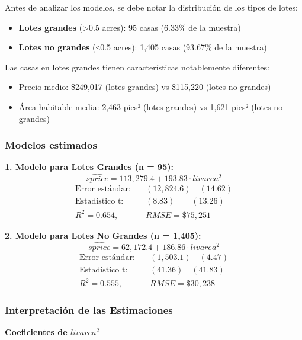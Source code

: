 \documentclass[12pt]{article}
\begin{document}
Antes de analizar los modelos, se debe notar la distribución de los tipos de lotes:
\begin{itemize}
    \item \textbf{Lotes grandes} (>0.5 acres): 95 casas (6.33\% de la muestra)
    \item \textbf{Lotes no grandes} (≤0.5 acres): 1,405 casas (93.67\% de la muestra)
\end{itemize}

Las casas en lotes grandes tienen características notablemente diferentes:
\begin{itemize}
    \item Precio medio: \$249,017 (lotes grandes) vs \$115,220 (lotes no grandes)
    \item Área habitable media: 2,463 pies² (lotes grandes) vs 1,621 pies² (lotes no grandes)
\end{itemize}

\subsubsection*{Modelos estimados}

\textbf{1. Modelo para Lotes Grandes (n = 95):}
\[
\widehat{sprice} = 113,279.4 + 193.83 \cdot livarea^2
\]
\begin{align}
\text{Error estándar:} \quad & (12,824.6) \quad (14.62) \\
\text{Estadístico t:} \quad & (8.83) \quad\quad (13.26) \\
R^2 = 0.654, \quad & RMSE = \$75,251
\end{align}

\textbf{2. Modelo para Lotes No Grandes (n = 1,405):}
\[
\widehat{sprice} = 62,172.4 + 186.86 \cdot livarea^2
\]
\begin{align}
\text{Error estándar:} \quad & (1,503.1) \quad (4.47) \\
\text{Estadístico t:} \quad & (41.36) \quad (41.83) \\
R^2 = 0.555, \quad & RMSE = \$30,238
\end{align}

\subsubsection*{Interpretación de las Estimaciones}

\textbf{Coeficientes de $livarea^2$}
\end{document}
